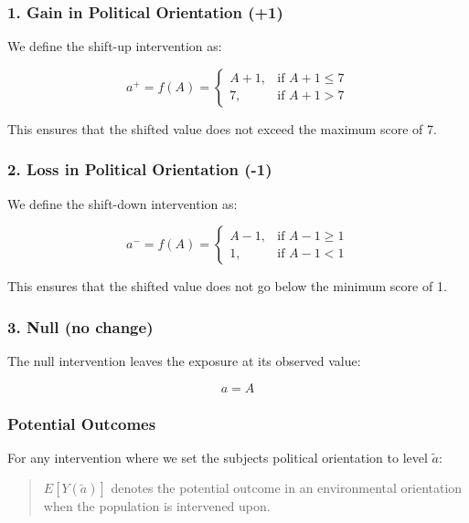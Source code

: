 \documentclass[
  single column]{article}
\begin{document}
\subsubsection{1. Gain in Political Orientation
(+1)}\label{gain-in-political-orientation-1}

We define the shift-up intervention as:

\[
a^+ = f(A) = 
\begin{cases}
A + 1, & \text{if } A + 1 \leq 7 \\
7, & \text{if } A + 1 > 7
\end{cases}
\]

This ensures that the shifted value does not exceed the maximum score of
7.

\subsubsection{2. Loss in Political Orientation
(-1)}\label{loss-in-political-orientation--1}

We define the shift-down intervention as:

\[
a^{-} = f(A) = 
\begin{cases}
A - 1, & \text{if } A - 1 \geq 1 \\
1, & \text{if } A - 1 < 1
\end{cases}
\]

This ensures that the shifted value does not go below the minimum score
of 1.

\subsubsection{3. Null (no change)}\label{null-no-change}

The null intervention leaves the exposure at its observed value:

\[
a = A
\]

\subsubsection{Potential Outcomes}\label{potential-outcomes}

For any intervention where we set the subjects political orientation to
level \(\tilde{a}\):

\begin{quote}
\(E[Y(\tilde{a})]\) denotes the potential outcome in an environmental
orientation when the population is intervened upon.
\end{quote}
\end{document}
